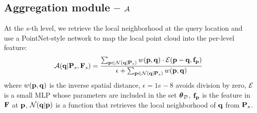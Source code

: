 \subsection{Aggregation module -- \texorpdfstring{$\mathcal{A}$}{}}
\label{sec:aggregation}
At the $s$-th level, we retrieve the local neighborhood at the query location and use a PointNet-style network to map the local point cloud into the per-level feature:
\begin{align}    
\mathcal{A}(\mathbf{q} | \mathbf{P}_s, \mathbf{F}_s) = 
\frac{
\sum_{\mathbf{p} \in \mathcal{N}(\mathbf{q} | \mathbf{P}_s)} w(\mathbf{p}, \mathbf{q}) \cdot \mathcal{E}(\mathbf{p} - \mathbf{q}, \mathbf{f}_{\mathbf{p}})  
}{
\epsilon + \sum_{\mathbf{p} \in \mathcal{N}(\mathbf{q} | \mathbf{P}_s)} w(\mathbf{p}, \mathbf{q}) 
}
\end{align}
where  $w(\mathbf{p}, \mathbf{q})$ is the inverse spatial distance, 
$\epsilon{=}1e{-}8$ avoids division by zero, $\mathcal{E}$ is a small MLP whose parameters are included in the set $\boldsymbol{\theta}_{\mathcal{D}}$, $\mathbf{f}_{\mathbf{p}}$ is the feature in $\mathbf{F}$ at $\mathbf{p}$, $\mathcal{N}(\mathbf{q} | \mathbf{p})$ is a function that retrieves the local neighborhood of $\mathbf{q}$ from $\mathbf{P}_s$. 



